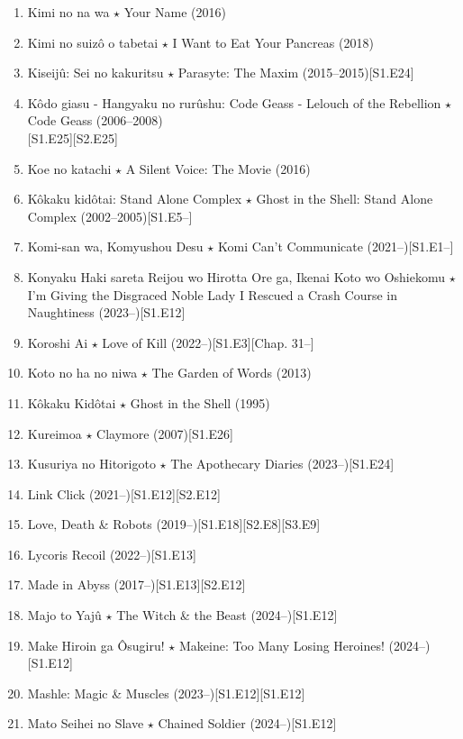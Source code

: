 \documentclass{article}
\begin{document}
\begin{enumerate}
    \item {\sc Kimi no na wa $\star$ Your Name} (2016)
    \item {\sc Kimi no suiz\^o o tabetai $\star$ I Want to Eat Your Pancreas} (2018)
    \item {\sc Kiseij\^u: Sei no kakuritsu $\star$ Parasyte: The Maxim} (2015--2015)\hfill[S1.E24]
    \item {\sc Kôdo giasu - Hangyaku no rurûshu: Code Geass - Lelouch of the Rebellion $\star$ Code Geass} (2006--2008)\\\mbox{}\hfill[S1.E25][S2.E25]
    \item {\sc Koe no katachi $\star$ A Silent Voice: The Movie} (2016)
    \item Kôkaku kidôtai: Stand Alone Complex $\star$ Ghost in the Shell: Stand Alone Complex (2002--2005)\hfill[S1.E5--]
    \item Komi-san wa, Komyushou Desu $\star$ Komi Can't Communicate (2021--)\hfill[S1.E1--]
    \item {\sc Konyaku Haki sareta Reijou wo Hirotta Ore ga, Ikenai Koto wo Oshiekomu $\star$ I'm Giving the Disgraced Noble Lady I Rescued a Crash Course in Naughtiness} (2023--)\hfill[S1.E12]
    \item Koroshi Ai $\star$ Love of Kill (2022--)\hfill[S1.E3][Chap. 31--]
    \item {\sc Koto no ha no niwa $\star$ The Garden of Words} (2013)
    \item {\sc K\^okaku Kid\^otai $\star$ Ghost in the Shell} (1995)
    \item {\sc Kureimoa $\star$ Claymore} (2007)\hfill[S1.E26]
    \item {\sc Kusuriya no Hitorigoto $\star$ The Apothecary Diaries} (2023--)\hfill[S1.E24]
    \item Link Click (2021--)\hfill[S1.E12][S2.E12]
    \item Love, Death \& Robots (2019--)\hfill[S1.E18][S2.E8][S3.E9]
    \item Lycoris Recoil (2022--)\hfill[S1.E13]
    \item Made in Abyss (2017--)\hfill[S1.E13][S2.E12]
    \item {\sc Majo to Yajû $\star$ The Witch \& the Beast} (2024--)\hfill[S1.E12]
    \item {\sc Make Hiroin ga Ôsugiru! $\star$ Makeine: Too Many Losing Heroines!} (2024--)\hfill[S1.E12]
    \item {\sc Mashle: Magic \& Muscles} (2023--)\hfill[S1.E12][S1.E12]
    \item {\sc Mato Seihei no Slave $\star$ Chained Soldier} (2024--)\hfill[S1.E12]

\end{enumerate}
\end{document}
